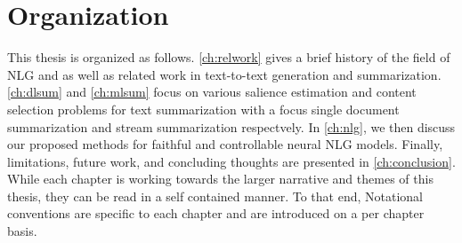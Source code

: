 \section{Organization}
This thesis is organized as follows. \autoref{ch:relwork} gives a brief history
of the field of NLG and as well as related work in text-to-text generation and summarization. \autoref{ch:dlsum} and 
\autoref{ch:mlsum} focus on various salience estimation and content selection
problems for text summarization with a focus single document summarization
and stream summarization respectvely. In \autoref{ch:nlg}, we then discuss
our proposed methods for faithful and controllable neural NLG models. 
Finally, limitations, future work, and concluding thoughts are presented 
in \autoref{ch:conclusion}.
While each chapter is working towards the larger narrative and themes of this
thesis, they can be read in a self contained manner. To that end, Notational conventions
are specific to each chapter and are introduced on a per chapter basis.
